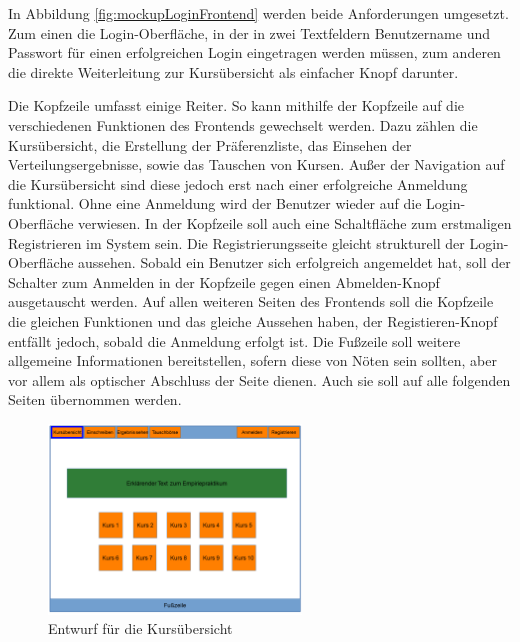             In Abbildung \ref{fig:mockupLoginFrontend} werden beide Anforderungen umgesetzt.
            Zum einen die Login-Oberfläche, in der in zwei Textfeldern Benutzername und Passwort für einen erfolgreichen Login eingetragen werden müssen, zum anderen die direkte Weiterleitung zur Kursübersicht als einfacher Knopf darunter.

            Die Kopfzeile umfasst einige Reiter.
            So kann mithilfe der Kopfzeile auf die verschiedenen Funktionen des Frontends gewechselt werden. 
            Dazu zählen die Kursübersicht, die Erstellung der Präferenzliste, das Einsehen der Verteilungsergebnisse, sowie das Tauschen von Kursen.
            Außer der Navigation auf die Kursübersicht sind diese jedoch erst nach einer erfolgreiche Anmeldung funktional.
            Ohne eine Anmeldung wird der Benutzer wieder auf die Login-Oberfläche verwiesen.
            In der Kopfzeile soll auch eine Schaltfläche zum erstmaligen Registrieren im System sein.
            Die Registrierungsseite gleicht strukturell der Login-Oberfläche aussehen.
            Sobald ein Benutzer sich erfolgreich angemeldet hat, soll der Schalter zum Anmelden in der Kopfzeile gegen einen Abmelden-Knopf ausgetauscht werden.
			Auf allen weiteren Seiten des Frontends soll die Kopfzeile die gleichen Funktionen und das gleiche Aussehen haben, der Registieren-Knopf entfällt jedoch, sobald die Anmeldung erfolgt ist.
            Die Fußzeile soll weitere allgemeine Informationen bereitstellen, sofern diese von Nöten sein sollten, aber vor allem als optischer Abschluss der Seite dienen.
            Auch sie soll auf alle folgenden Seiten übernommen werden.
			
			\begin{figure}[t]
				\centering
				\includegraphics[width=0.6\textwidth]{./design/images/MockUpsFrontend/frontendCourses.png}
				\caption{Entwurf für die Kursübersicht}
				\label{fig:mockupCoursesFrontend}
			\end{figure}
			
